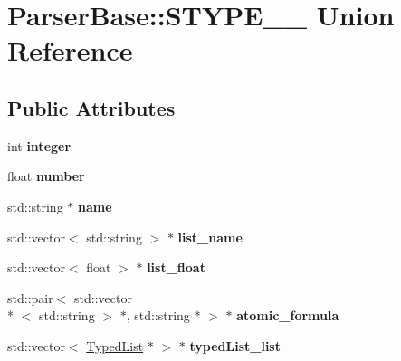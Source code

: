 \hypertarget{unionParserBase_1_1STYPE____}{\section{Parser\+Base\+:\+:S\+T\+Y\+P\+E\+\_\+\+\_\+ Union Reference}
\label{unionParserBase_1_1STYPE____}
}
\subsection*{Public Attributes}
\begin{DoxyCompactItemize}
\item 
\hypertarget{unionParserBase_1_1STYPE_____af8152366c391a9a3c6dfeebd38dd6072}{int {\bfseries integer}}\label{unionParserBase_1_1STYPE_____af8152366c391a9a3c6dfeebd38dd6072}

\item 
\hypertarget{unionParserBase_1_1STYPE_____a3d0cb98bf31057ecd7a908afbe3ca55f}{float {\bfseries number}}\label{unionParserBase_1_1STYPE_____a3d0cb98bf31057ecd7a908afbe3ca55f}

\item 
\hypertarget{unionParserBase_1_1STYPE_____af9a7a51fe1e387c4c8214d7942e2a58a}{std\+::string $\ast$ {\bfseries name}}\label{unionParserBase_1_1STYPE_____af9a7a51fe1e387c4c8214d7942e2a58a}

\item 
\hypertarget{unionParserBase_1_1STYPE_____acadc01542881f7e6add2ea0e05562e8b}{std\+::vector$<$ std\+::string $>$ $\ast$ {\bfseries list\+\_\+name}}\label{unionParserBase_1_1STYPE_____acadc01542881f7e6add2ea0e05562e8b}

\item 
\hypertarget{unionParserBase_1_1STYPE_____a4bd64b9de1820c87495a8bd2c914e9ad}{std\+::vector$<$ float $>$ $\ast$ {\bfseries list\+\_\+float}}\label{unionParserBase_1_1STYPE_____a4bd64b9de1820c87495a8bd2c914e9ad}

\item 
\hypertarget{unionParserBase_1_1STYPE_____a96b9185e300e325c901f02ab6c4b3297}{std\+::pair$<$ std\+::vector\\*
$<$ std\+::string $>$ $\ast$, std\+::string $\ast$ $>$ $\ast$ {\bfseries atomic\+\_\+formula}}\label{unionParserBase_1_1STYPE_____a96b9185e300e325c901f02ab6c4b3297}

\item 
\hypertarget{unionParserBase_1_1STYPE_____a931331d6fc1c63176aface5775f7973d}{std\+::vector$<$ \hyperlink{classTypedList}{Typed\+List} $\ast$ $>$ $\ast$ {\bfseries typed\+List\+\_\+list}}\label{unionParserBase_1_1STYPE_____a931331d6fc1c63176aface5775f7973d}


\end{DoxyCompactItemize}
